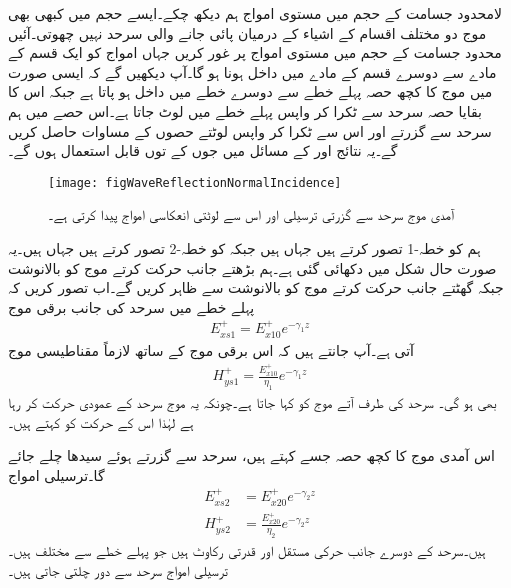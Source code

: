 لامحدود جسامت کے حجم میں مستوی امواج ہم دیکھ چکے۔ایسے حجم میں کبھی بھی موج دو مختلف اقسام کے اشیاء کے درمیان پائی جانے والی سرحد نہیں چھوتی۔آئیں محدود جسامت کے حجم میں مستوی امواج پر غور کریں جہاں امواج کو ایک قسم کے مادے سے دوسرے قسم کے مادے میں داخل ہونا ہو گا۔آپ دیکھیں گے کہ ایسی صورت میں موج کا کچھ حصہ پہلے خطے سے دوسرے خطے میں داخل ہو پاتا ہے جبکہ اس کا بقایا حصہ سرحد سے ٹکرا کر واپس پہلے خطے میں لوٹ جاتا ہے۔اس حصے میں ہم سرحد سے گزرتے اور اس سے ٹکرا کر واپس لوٹتے حصوں کے مساوات حاصل کریں گے۔یہ نتائج   اور   کے مسائل میں جوں کے توں قابل استعمال ہوں گے۔
\begin{figure}
\centering
\texttt{[image: figWaveReflectionNormalIncidence]}
\caption{آمدی موج سرحد سے گزرتی ترسیلی اور اس سے  لوٹتی انعکاسی امواج پیدا کرتی ہے۔}
\label{شکل_موج_آمدی_انعکاسی_ترسیلی}
\end{figure}

ہم  کو خطہ-1 تصور کرتے ہیں جہاں  ہیں جبکہ  کو خطہ-2 تصور کرتے ہیں جہاں  ہیں۔یہ صورت حال شکل  میں دکھائی گئی ہے۔ہم بڑھتے  جانب حرکت کرتے موج کو بالانوشت  جبکہ گھٹتے  جانب حرکت کرتے موج کو بالانوشت  سے ظاہر کریں گے۔اب تصور کریں کہ پہلے خطے میں سرحد کی جانب برقی موج
\begin{align}\label{مساوات_موج_برقی_الف_آمد}
E_{xs1}^+=E_{x10}^+e^{-\gamma_1 z}
\end{align}
آتی ہے۔آپ جانتے ہیں کہ اس برقی موج کے ساتھ لازماً مقناطیسی موج
\begin{align}
H_{ys1}^+=\frac{E_{x10}^+}{\eta_1} e^{-\gamma_1 z}\label{مساوات_موج_مقناطیسی_الف_آمد}
\end{align}
بھی ہو گی۔ سرحد کی طرف آتے موج کو  کہا جاتا ہے۔چونکہ یہ موج سرحد کے عمودی حرکت کر رہا ہے لہٰذا اس کے حرکت کو  کہتے ہیں۔

اس آمدی موج کا کچھ حصہ جسے  کہتے ہیں، سرحد سے گزرتے ہوئے  سیدھا چلے جائے گا۔ترسیلی امواج
\begin{align}
E_{xs2}^+&=E_{x20}^+e^{-\gamma_2 z}\label{مساوات_موج_برقی_ب_ترسیلی}\\
H_{ys2}^+&=\frac{E_{x20}^+}{\eta_2} e^{-\gamma_2 z}\label{مساوات_موج_مقناطیسی_ب_ترسیلی}
\end{align}
ہیں۔سرحد کے دوسرے جانب حرکی مستقل  اور قدرتی رکاوٹ  ہیں جو پہلے خطے سے مختلف ہیں۔ترسیلی امواج سرحد سے دور چلتی جاتی ہیں۔

